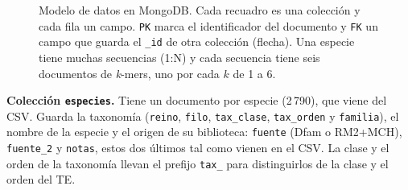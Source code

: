 \begin{figure}[htbp]
{}
\caption{Modelo de datos en MongoDB. Cada recuadro es una colección y
cada fila un campo. \texttt{PK} marca el identificador del documento y
\texttt{FK} un campo que guarda el \texttt{\_id} de otra colección
(flecha). Una especie tiene muchas secuencias (1:N) y cada secuencia
tiene seis documentos de \textit{k}-mers, uno por cada $k$ de 1 a 6.}
\label{fig:modelo}
\end{figure}

\medskip\noindent\textbf{Colección \texttt{especies}.} Tiene un
documento por especie (2\,790), que viene del CSV. Guarda la taxonomía
(\texttt{reino}, \texttt{filo}, \texttt{tax\_clase}, \texttt{tax\_orden}
y \texttt{familia}), el nombre de la especie y el origen de su
biblioteca: \texttt{fuente} (Dfam o RM2+MCH), \texttt{fuente\_2} y
\texttt{notas}, estos dos últimos tal como vienen en el CSV. La clase y
el orden de la taxonomía llevan el prefijo \texttt{tax\_} para
distinguirlos de la clase y el orden del TE.

